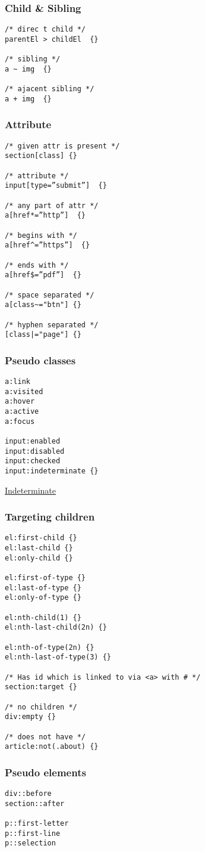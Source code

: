 \subsubsection{Child & Sibling}

\begin{verbatim}
/* direc t child */
parentEl > childEl  {}

/* sibling */
a ~ img  {}

/* ajacent sibling */
a + img  {}
\end{verbatim}

\subsubsection{Attribute}

\begin{verbatim}
/* given attr is present */
section[class] {}

/* attribute */
input[type=”submit”]  {}

/* any part of attr */
a[href*=”http”]  {}

/* begins with */
a[href^=”https”]  {}

/* ends with */
a[href$=”pdf”]  {}

/* space separated */
a[class~="btn"] {}

/* hyphen separated */
[class|="page"] {}
\end{verbatim}

\subsubsection{Pseudo classes}

\begin{verbatim}
a:link
a:visited
a:hover
a:active
a:focus

input:enabled
input:disabled
input:checked
input:indeterminate {}
\end{verbatim}

\href{https://css-tricks.com/indeterminate-checkboxes/}{Indeterminate}

\subsubsection{Targeting children}

\begin{verbatim}
el:first-child {}
el:last-child {}
el:only-child {}

el:first-of-type {}
el:last-of-type {}
el:only-of-type {}

el:nth-child(1) {}
el:nth-last-child(2n) {}

el:nth-of-type(2n) {}
el:nth-last-of-type(3) {}

/* Has id which is linked to via <a> with # */
section:target {}

/* no children */
div:empty {}

/* does not have */
article:not(.about) {}
\end{verbatim}

\subsubsection{Pseudo elements}

\begin{verbatim}
div::before
section::after

p::first-letter
p::first-line
p::selection
\end{verbatim}
